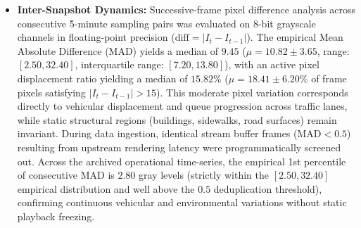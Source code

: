 \documentclass[preprint,12pt]{elsarticle}
\begin{document}
\begin{itemize}
    \item \textbf{Inter-Snapshot Dynamics:} Successive-frame pixel difference analysis across consecutive 5-minute sampling pairs was evaluated on 8-bit grayscale channels in floating-point precision ($\text{diff} = |I_t - I_{t-1}|$). The empirical Mean Absolute Difference (MAD) yields a median of $\mathbf{9.45}$ ($\mu = 10.82 \pm 3.65$, range: $[2.50, 32.40]$, interquartile range: $[7.20, 13.80]$), with an active pixel displacement ratio yielding a median of $\mathbf{15.82\%}$ ($\mu = 18.41 \pm 6.20\%$ of frame pixels satisfying $|I_t - I_{t-1}| > 15$). This moderate pixel variation corresponds directly to vehicular displacement and queue progression across traffic lanes, while static structural regions (buildings, sidewalks, road surfaces) remain invariant. During data ingestion, identical stream buffer frames ($\text{MAD} < 0.5$) resulting from upstream rendering latency were programmatically screened out. Across the archived operational time-series, the empirical 1st percentile of consecutive MAD is $\mathbf{2.80}$ gray levels (strictly within the $[2.50, 32.40]$ empirical distribution and well above the $0.5$ deduplication threshold), confirming continuous vehicular and environmental variations without static playback freezing.
\end{itemize}
\end{document}
